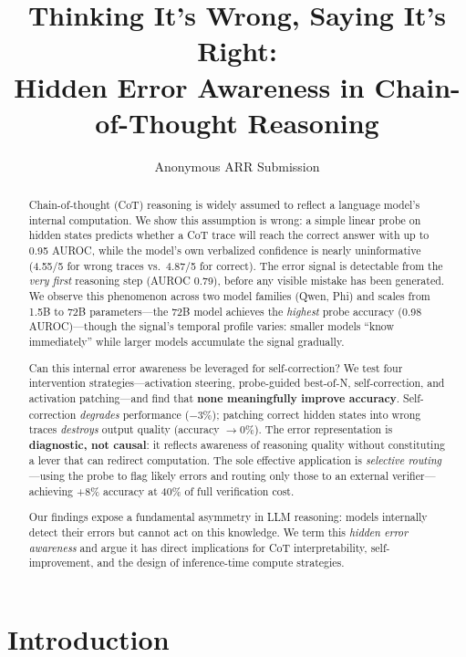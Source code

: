 \documentclass[11pt]{article}
\title{Thinking It's Wrong, Saying It's Right: \\ Hidden Error Awareness in Chain-of-Thought Reasoning}
\author{
  Anonymous ARR Submission
}
\begin{document}
\maketitle

\begin{abstract}
Chain-of-thought (CoT) reasoning is widely assumed to reflect a language model's internal computation.
We show this assumption is wrong: a simple linear probe on hidden states predicts whether a CoT trace will reach the correct answer with up to 0.95 AUROC, while the model's own verbalized confidence is nearly uninformative (4.55/5 for wrong traces vs.\ 4.87/5 for correct).
The error signal is detectable from the \textit{very first} reasoning step (AUROC 0.79), before any visible mistake has been generated.
We observe this phenomenon across two model families (Qwen, Phi) and scales from 1.5B to 72B parameters---the 72B model achieves the \textit{highest} probe accuracy (0.98 AUROC)---though the signal's temporal profile varies: smaller models ``know immediately'' while larger models accumulate the signal gradually.

Can this internal error awareness be leveraged for self-correction?
We test four intervention strategies---activation steering, probe-guided best-of-N, self-correction, and activation patching---and find that \textbf{none meaningfully improve accuracy}.
Self-correction \textit{degrades} performance ($-3\%$); patching correct hidden states into wrong traces \textit{destroys} output quality (accuracy $\to 0\%$).
The error representation is \textbf{diagnostic, not causal}: it reflects awareness of reasoning quality without constituting a lever that can redirect computation.
The sole effective application is \textit{selective routing}---using the probe to flag likely errors and routing only those to an external verifier---achieving +8\% accuracy at 40\% of full verification cost.

Our findings expose a fundamental asymmetry in LLM reasoning: models internally detect their errors but cannot act on this knowledge.
We term this \textit{hidden error awareness} and argue it has direct implications for CoT interpretability, self-improvement, and the design of inference-time compute strategies.
\end{abstract}

\section{Introduction}
\label{sec:intro}
\end{document}
